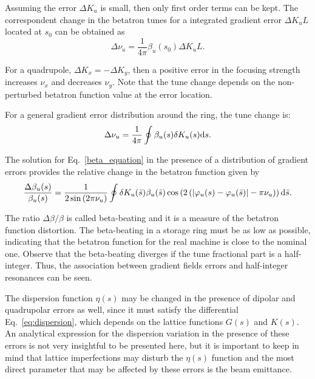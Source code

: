 Assuming the error $\Delta K_u$ is small, then only first order terms can be kept. The correspondent change in the betatron tunes for a integrated gradient error $\Delta K_u L$ located at $s_0$ can be obtained as
\begin{equation}
    \Delta \nu_u = \dfrac{1}{4 \pi} \beta_u (s_0) \Delta K_u L.
\end{equation}

For a quadrupole, $\Delta K_x = - \Delta K_y$, then a positive error in the focusing strength increases $\nu_x$ and decreases $\nu_y$. Note that the tune change depends on the non-perturbed betatron function value at the error location.

For a general gradient error distribution around the ring, the tune change is:
\begin{equation}
    \Delta \nu_u = \dfrac{1}{4 \pi} \oint \beta_u ({s}) \delta K_u ({s})\mathrm{d} {s}.
    \label{eq:tune_shift}
\end{equation}

The solution for Eq.~\eqref{beta_equation} in the presence of a distribution of gradient errors provides the relative change in the betatron function given by
\begin{equation}
    \dfrac{\Delta \beta_u(s)}{\beta_u(s)} = \dfrac{1}{2\sin\left(2\pi \nu_u\right)} \oint \delta K_u(\bar{s}) \beta_u(\bar{s}) \cos\left(2\left(|\varphi_{u}(s) - \varphi_{u}(\bar{s})| - \pi\nu_{u} \right)\right) \mathrm{d} \bar{s}.
\end{equation}

The ratio $\Delta \beta/\beta$ is called beta-beating and it is a measure of the betatron function distortion. The beta-beating in a storage ring must be as low as possible, indicating that the betatron function for the real machine is close to the nominal one. Observe that the beta-beating diverges if the tune fractional part is a half-integer. Thus, the association between gradient fields errors and half-integer resonances can be seen.

The dispersion function $\eta(s)$ may be changed in the presence of dipolar and quadrupolar errors as well, since it must satisfy the differential Eq.~\eqref{eq:dispersion}, which depends on the lattice functions $G(s)$ and $K(s)$. An analytical expression for the dispersion variation in the presence of these errors is not very insightful to be presented here, but it is important to keep in mind that lattice imperfections may disturb the $\eta(s)$ function and the most direct parameter that may be affected by these errors is the beam emittance.
